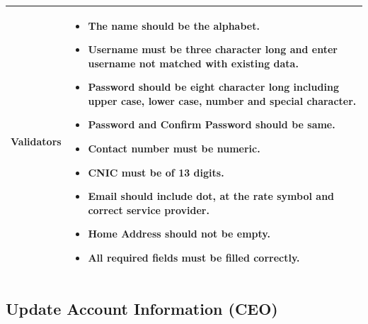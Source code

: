 \documentclass[12pt,a4paper]{article}
\begin{document}
\begin{longtable}{| p{3cm}|p{12cm}|}
Validators & 
\begin{itemize}
\item  The name should be the alphabet.
\item  Username must be three character long and enter username not matched with existing data.
\item Password should be eight character long including upper case, lower case, number and special character.

\item  Password and Confirm Password should be same.
\item  Contact number must be numeric. 
\item  CNIC must be of 13 digits.
\item  Email should include dot, at the rate symbol and correct service provider.
\item Home Address should not be empty. 
\item All required fields must be filled correctly. 
\end{itemize}
\\ \hline

\end{longtable} 

\subsection{Update Account Information (CEO)}
\end{document}
